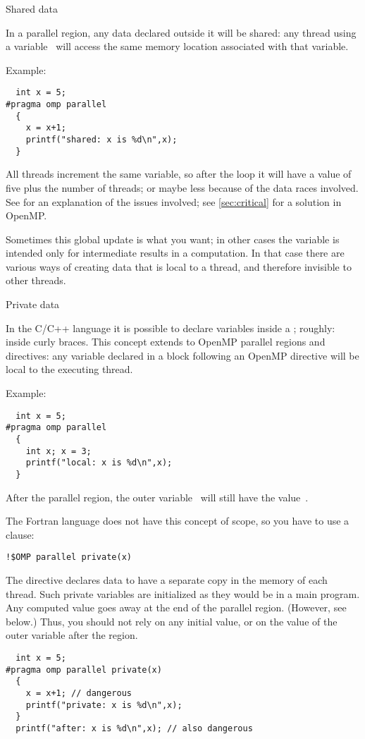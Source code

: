  {Shared data}

In a parallel region, any data declared outside it will be shared:
any thread using a variable~ will access the same memory location
associated with that variable.

Example:
\begin{verbatim}
  int x = 5;
#pragma omp parallel
  {
    x = x+1;
    printf("shared: x is %d\n",x);
  }
\end{verbatim}
All threads increment the same variable, so after the loop it will
have a value of five plus the number of threads; or maybe less because of the data races
involved. See  for an explanation of the issues involved;
see \ref{sec:critical} for a solution in OpenMP.

Sometimes this global update is what you want; in other cases the
variable is intended only for intermediate results in a computation.
In that case 
there are various ways of creating
data that is local to a thread, and therefore invisible to other threads.

 {Private data}

In the C/C++ language it is possible to declare variables inside
a ; roughly: inside curly braces.
This concept extends to OpenMP parallel regions and directives:
any variable declared in a block following an OpenMP directive
will be local to the executing thread.

Example:
\begin{verbatim}
  int x = 5;
#pragma omp parallel
  {
    int x; x = 3;
    printf("local: x is %d\n",x);
  }
\end{verbatim}
After the parallel region, the outer variable~ will still have the value~.

The Fortran language does not have this concept of scope, so you have to use a
 clause:
\begin{verbatim}
!$OMP parallel private(x)
\end{verbatim}

The  directive declares data to have a separate copy 
in the memory of each thread. 
Such private variables are initialized as they would be in a main program.
Any computed value goes away at the end 
of the parallel region. (However, see below.)
Thus, you should not rely on any initial value, or on the value of the outer variable
after the region.

\begin{verbatim}
  int x = 5;
#pragma omp parallel private(x)
  {
    x = x+1; // dangerous
    printf("private: x is %d\n",x);
  }
  printf("after: x is %d\n",x); // also dangerous
\end{verbatim}

